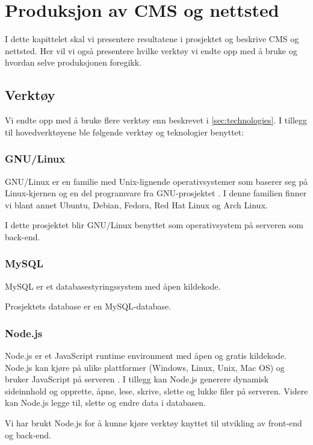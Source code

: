 \cleardoublepage
\chapter{Produksjon av CMS og nettsted}
\label{chap:implementation} 

I dette kapittelet skal vi presentere resultatene i prosjektet og beskrive CMS og nettsted. Her vil vi også presentere hvilke verktøy vi endte opp med å bruke og hvordan selve produksjonen foregikk.

\section{Verktøy}
Vi endte opp med å bruke flere verktøy enn beskrevet i  \ref{sec:technologies}. 
I tillegg til hovedverktøyene ble følgende verktøy og teknologier benyttet:

\subsection{GNU/Linux}
GNU/Linux er en familie med Unix-lignende operativsystemer som baserer seg på Linux-kjernen \cite{kernel_org} og en del programvare fra GNU-prosjektet \cite{gnu_org}. I denne familien finner vi blant annet Ubuntu, Debian, Fedora, Red Hat Linux og Arch Linux.

I dette prosjektet blir GNU/Linux benyttet som operativsystem på serveren som  back-end.

\subsection{MySQL}
MySQL \cite{oracle2019am} er et databasestyringssystem med åpen kildekode.

Prosjektets database er en MySQL-database.

\subsection{Node.js}
Node.js er et JavaScript runtime environment med åpen og gratis kildekode. Node.js kan kjøre på ulike plattformer (Windows, Linux, Unix, Mac OS) og bruker JavaScript på serveren \cite{w3schools2019win}. I tillegg kan Node.js generere dynamisk sideinnhold og opprette, åpne, lese, skrive, slette og lukke filer på serveren. Videre kan Node.js legge til, slette og endre data i databasen.

Vi har brukt Node.js for å kunne kjøre verktøy knyttet til utvikling av front-end og back-end.


